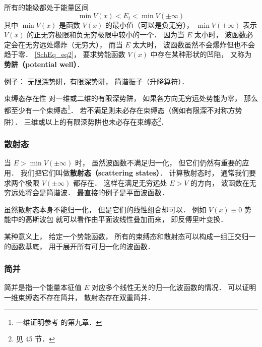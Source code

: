 所有的能级都处于能量区间
\begin{equation}\label{SchEq_eq2}
\min V(x) < E_i < \min V(\pm\infty)
\end{equation}
其中 $\min V(x)$ 是函数 $V(x)$ 的最小值（可以是负无穷）， $\min V(\pm\infty)$ 表示 $V(x)$ 的正无穷极限和负无穷极限中较小的一个． 因为当 $E$ 太小时， 波函数必定会在无穷远处爆炸（无穷大）， 而当 $E$ 太大时， 波函数虽然不会爆炸但也不会趋于零． \autoref{SchEq_eq2}， 要求势能函数 $V(x)$ 中存在某种形状的凹陷， 又称为\textbf{势阱（potential well）}．

例子： 无限深势阱，有限深势阱， 简谐振子（升降算符）．

\begin{theorem}{束缚态存在性}
对一维或二维的有限深势阱， 如果各方向无穷远处势能为零， 那么都至少有一个束缚态\footnote{一维证明参考 \cite{Teschl} 的第九章．}． 若不满足则未必存在束缚态（例如有限深不对称方势阱）． 三维或以上的有限深势阱也未必存在束缚态\footnote{见 \cite{Landau} 45 节．}．
\end{theorem}

\subsubsection{散射态}
当 $E > \min V(\pm\infty)$ 时， 虽然波函数不满足归一化， 但它们仍然有重要的应用． 我们把它们叫做\textbf{散射态（scattering states）}． 计算散射态时， 通常我们要求两个极限 $V(\pm \infty)$ 都存在． 这样在满足无穷远处 $E > V$ 的方向， 波函数在无穷远处将会是简谐波． 最直接的例子是平面波函数． %

虽然散射态本身不能归一化， 但是它们的线性组合却可以． 例如 $V(x) \equiv 0$ 势能中的高斯波包 就可以看作由平面波线性叠加而来， 即反傅里叶变换．

某种意义上， 给定一个势能函数， 所有的束缚态和散射态可以构成一组正交归一的函数基底， 用于展开所有可归一化的波函数．

\subsubsection{简并}
简并是指一个能量本征值 $E$ 对应多个线性无关的归一化波函数的情况． 可以证明一维束缚态不存在简并， 散射态存在双重简并．

